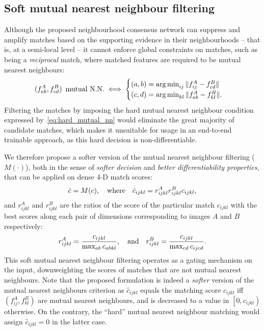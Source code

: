 \documentclass{article}
\DeclareMathOperator*{\argmin}{arg\,min}
\begin{document}
\subsection{Soft mutual nearest neighbour filtering}
Although the proposed neighbourhood consensus network can suppress and amplify matches based on the supporting evidence in their neighbourhoods -- that is, at a semi-local level -- it cannot enforce global constraints on matches, such as being a \emph{reciprocal} match, where matched features are required to be mutual nearest neighbours:
\begin{equation}
    (f^A_{ab},f^B_{cd})\text{\, mutual N.N.} \iff   \begin{cases}
    (a,b) = \argmin_{ij} \| f^A_{ij}-f^B_{cd} \| \\
    (c,d) = \argmin_{kl} \| f^A_{ab}-f^B_{kl} \|.
    \end{cases}
    \label{eq:hard_mutual_nn}
\end{equation}
Filtering the matches by imposing the hard mutual nearest neighbour condition expressed by~\eqref{eq:hard_mutual_nn} would eliminate the great majority of candidate matches, which makes it unsuitable for usage in an end-to-end trainable approach, as this hard decision is non-differentiable.

We therefore propose a softer version of the mutual nearest neighbour filtering ($M(\cdot)$), both in the sense of \emph{softer decision} and \emph{better differentiability properties}, that can be applied on dense 4-D match scores:
\begin{equation}
   \hat{c}=M(c), \text{\quad where\quad } \hat{c}_{ijkl} = r^A_{ijkl} r^B_{ijkl} c_{ijkl},
\end{equation}
and $r^A_{ijkl}$ and $r^B_{ijkl}$ are the ratios of the score of the particular match $c_{ijkl}$ with the best scores along each pair of dimensions corresponding to images $A$ and $B$ respectively:
\begin{equation}
    r^A_{ijkl}=\frac{c_{ijkl}}{\max_{ab} c_{abkl}},\text{\quad and\quad }r^B_{ijkl}=\frac{c_{ijkl}}{\max_{cd} c_{ijcd}}.
\end{equation}
This soft mutual nearest neighbour filtering operates as a gating mechanism on the input, downweighting the scores of matches that are not mutual nearest neighbours. Note that the proposed formulation is indeed a \emph{softer} version of the mutual nearest neighbours criterion as $\hat{c}_{ijkl}$ equals the matching score $c_{ijkl}$ iff $(f^A_{ij},f^B_{kl})$ are mutual nearest neighbours, and is decreased to a value in $\left[0,c_{ijkl}\right)$ otherwise. On the contrary, the ``hard'' mutual nearest neighbour matching would assign $\hat{c}_{ijkl}=0$ in the latter case.
\end{document}
